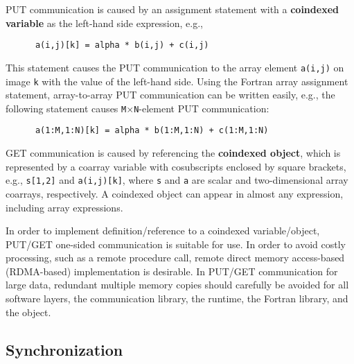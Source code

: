 PUT communication is caused by an assignment statement with a {\bf coindexed variable} 
as the left-hand side expression, e.g.,
\begin{verbatim}
      a(i,j)[k] = alpha * b(i,j) + c(i,j)
\end{verbatim}
This statement causes the PUT communication to the array element {\tt a(i,j)}
on image {\tt k} with the value of the left-hand side.
%
Using the Fortran array assignment statement, array-to-array PUT communication 
can be written easily, e.g., the following statement causes 
{\tt M}$\times${\tt N}-element PUT communication:
\begin{verbatim}
      a(1:M,1:N)[k] = alpha * b(1:M,1:N) + c(1:M,1:N)
\end{verbatim}

GET communication is caused by referencing the {\bf coindexed object}, 
which is represented by a coarray variable with cosubscripts enclosed by square brackets, 
e.g., {\tt s[1,2]} and {\tt a(i,j)[k]}, where {\tt s} and {\tt a} are scalar and 
two-dimensional array coarrays, respectively.
%
A coindexed object can appear in almost any expression, including array expressions.

\requirement
In order to implement definition/reference to a coindexed variable/object,
PUT/GET one-sided communication is suitable for use.
%
In order to avoid costly processing, such as a remote procedure call, 
remote direct memory access-based (RDMA-based) implementation is desirable.
%
In PUT/GET communication for large data, redundant multiple memory copies 
should carefully be avoided for all software layers, the communication library, the runtime, the Fortran library, and the object.



\subsection{Synchronization}\label{sec:spec-sync}

